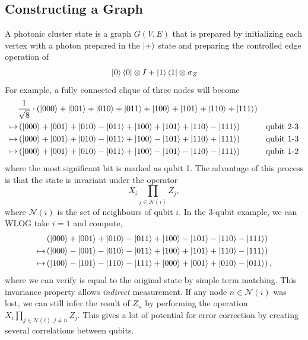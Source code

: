 \documentclass[%
 reprint,
 amsmath,amssymb
 aps,
]{revtex4}
\theoremstyle{remark}
\begin{document}
\subsection{Constructing a Graph}
A photonic cluster state is a graph $G(V,E)$ that is prepared by initializing each vertex with a photon prepared in the $\ket{+}$ state and preparing the controlled edge operation of 
\begin{equation}
    \ket{0}\bra{0} \otimes I + \ket{1}\bra{1}\otimes \sigma_Z
\end{equation}
For example, a fully connected clique of three nodes will become 
\begin{align}
    & \frac{1}{\sqrt{8}} \cdot \left(\ket{000}+\ket{001}+\ket{010}+\ket{011}+\ket{100}+\ket{101}+\ket{110}+\ket{111}\right) \\ 
\mapsto & \left(\ket{000}+\ket{001}+\ket{010}-\ket{011}+\ket{100}+\ket{101}+\ket{110}-\ket{111}\right) & \text{qubit 2-3}\\ 
\mapsto & \left(\ket{000}+\ket{001}+\ket{010}-\ket{011}+\ket{100}-\ket{101}+\ket{110}+\ket{111}\right) & \text{qubit 1-3} \\
\mapsto & \left(\ket{000}+\ket{001}+\ket{010}-\ket{011}+\ket{100}-\ket{101}-\ket{110}-\ket{111}\right) & \text{qubit 1-2}
\end{align}
where the most significant bit is marked as qubit 1. The advantage of this process is that the state is invariant under the operator
\begin{equation}
    X_i \prod_{j\in \mathcal{N}(i)}Z_j, 
\end{equation}
where $\mathcal{N}(i)$ is the set of neighbours of qubit $i.$ In the 3-qubit example, we can WLOG take $i=1$ and compute,
\begin{align}
    & \left(\ket{000}+\ket{001}+\ket{010}-\ket{011}+\ket{100}-\ket{101}-\ket{110}-\ket{111}\right) \\ 
    \mapsto & \left(\ket{000}-\ket{001}-\ket{010}-\ket{011}+\ket{100}+\ket{101}+\ket{110}-\ket{111}\right) \\ 
    \mapsto & \left(\ket{100}-\ket{101}-\ket{110}-\ket{111}+\ket{000}+\ket{001}+\ket{010}-\ket{011}\right),
\end{align} 
where we can verify is equal to the original state by simple term matching. This invariance property allows \textit{indirect} measurement. If any node $n \in \mathcal{N}(i)$ was lost, we can still infer the result of $Z_n$ by performing the operation $X_i \prod_{j\in \mathcal{N}(i), j\neq n} Z_j.$ This gives a lot of potential for error correction by creating several correlations between qubits.
\end{document}
